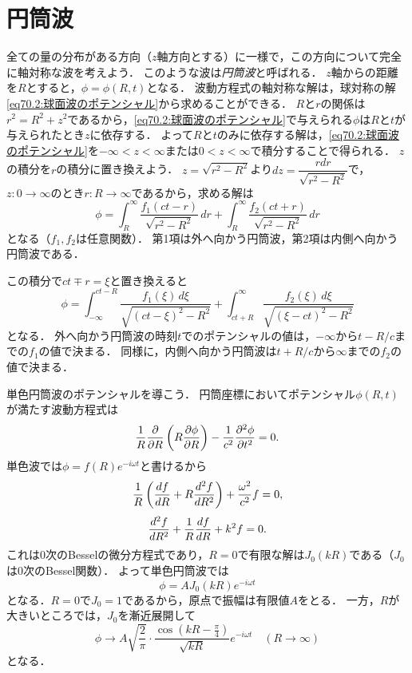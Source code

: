 \section{円筒波}

全ての量の分布がある方向（$z$軸方向とする）に一様で，この方向について完全に軸対称な波を考えよう．
このような波は\emph{円筒波}と呼ばれる．
$z$軸からの距離を$R$とすると，$\phi=\phi(R,t)$となる．
波動方程式の軸対称な解は，球対称の解\eqref{eq70.2:球面波のポテンシャル}から求めることができる．
$R$と$r$の関係は$r^2=R^2+z^2$であるから，\eqref{eq70.2:球面波のポテンシャル}で与えられる$\phi$は$R$と$t$が与えられたとき$z$に依存する．
よって$R$と$t$のみに依存する解は，\eqref{eq70.2:球面波のポテンシャル}を$-\infty<z<\infty$または$0<z<\infty$で積分することで得られる．
$z$の積分を$r$の積分に置き換えよう．
$z = \sqrt{r^2-R^2}$より$dz = \dfrac{rdr}{\sqrt{r^2-R^2}}$で，
$z:0\to\infty$のとき$r:R\to\infty$であるから，求める解は
\begin{equation}
    \phi = \int_{R}^{\infty} \frac{f_1(ct-r)}{\sqrt{r^2-R^2}} \, dr
    + \int_{R}^{\infty} \frac{f_2(ct+r)}{\sqrt{r^2-R^2}} \, dr
\end{equation}
となる（$f_1,f_2$は任意関数）．
第1項は外へ向かう円筒波，第2項は内側へ向かう円筒波である．

この積分で$ct \mp r = \xi$と置き換えると
\begin{equation}\label{eq71.2:円筒波の積分表示2}
    \phi = \int_{-\infty}^{ct-R} \frac{f_1(\xi) \, d\xi}{\sqrt{(ct-\xi)^2-R^2}}
    + \int_{ct+R}^{\infty} \frac{f_2(\xi) \, d\xi}{\sqrt{(\xi-ct)^2-R^2}}
\end{equation}
となる．
外へ向かう円筒波の時刻$t$でのポテンシャルの値は，$-\infty$から$t-R/c$までの$f_1$の値で決まる．
同様に，内側へ向かう円筒波は$t+R/c$から$\infty$までの$f_2$の値で決まる．



単色円筒波のポテンシャルを導こう．
円筒座標においてポテンシャル$\phi(R,t)$が満たす波動方程式は
\[
    \frac{1}{R} \pdv{R} \left( R \pdv{\phi}{R} \right) - \frac{1}{c^2} \pdv[2]{\phi}{t} = 0 .
\]
単色波では$\phi=f(R)e^{-i\omega t}$と書けるから
\[
    \frac{1}{R} \left( \dv{\,\! f}{R} + R \dv[2]{f}{R} \right) + \frac{\omega^2}{c^2} f = 0 ,
\]
\[
    \dv[2]{f}{R} + \frac{1}{R} \dv{\,\! f}{R} + k^2 f = 0.
\]
これは0次のBesselの微分方程式であり，$R=0$で有限な解は$J_0(kR)$である（$J_0$は0次のBessel関数）．
よって単色円筒波では%
\setcounter{equation}{3}%
\begin{equation}
    \phi = A J_0(kR) e^{-i\omega t}
\end{equation}
となる．$R=0$で$J_0=1$であるから，原点で振幅は有限値$A$をとる．
一方，$R$が大きいところでは，$J_0$を漸近展開して
\begin{equation}
    \phi \to A \sqrt{\frac{2}{\pi}} \cdot \frac{\cos\left( kR-\frac{\pi}{4} \right)}{\sqrt{kR}} e^{-i\omega t} \quad (R\to\infty)
\end{equation}
となる．



